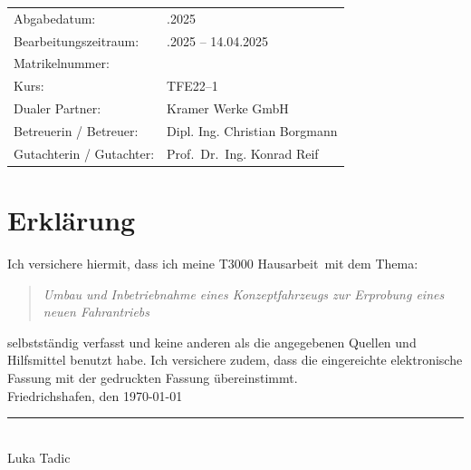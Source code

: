 \documentclass[a4paper, 12pt]{article} %
\newcommand{\titel}{Umbau und Inbetriebnahme eines Konzeptfahrzeugs zur Erprobung eines neuen Fahrantriebs}
\newcommand{\arbeit}{T3000 Hausarbeit}
\newcommand{\autor}{Luka Tadic}
\newcommand{\abgabe}{14.04.2025}
\newcommand{\bearbeitungszeitraum}{19.01.2025 – 14.04.2025}
\newcommand{\matrikelnr}{5726700}
\newcommand{\kurs}{TFE22–1} %
\newcommand{\firma}{Kramer Werke GmbH}
\newcommand{\betreuerfirma}{Dipl. Ing. Christian Borgmann}
\newcommand{\gutachterdhbw}{Prof.\ Dr.\ Ing. Konrad Reif}
\begin{document}
\begin{titlepage}
\begin{center}
\end{center}

\begin{center}
{\fontsize{12pt}{14pt}\selectfont
\begin{tabular}{ll}
Abgabedatum:                    & \quad \abgabe\\  
Bearbeitungszeitraum:           & \quad \bearbeitungszeitraum\\  
Matrikelnummer:                 & \quad \matrikelnr\\ 
Kurs:                           & \quad \kurs\\ 
Dualer Partner:                 & \quad \firma\\ %
Betreuerin / Betreuer:          & \quad \betreuerfirma\\  
Gutachterin / Gutachter:        & \quad \gutachterdhbw\\ [2ex]
\end{tabular}
}
\end{center}

\end{titlepage}

\clearpage

\pagestyle{scrheadings}  %
\hypersetup{pageanchor=true}



\section*{Erklärung}

Ich versichere hiermit, dass ich meine \arbeit\ mit dem Thema:

\begin{quote}
    \textit{\titel}
\end{quote}

selbstständig verfasst und keine anderen als die angegebenen Quellen und Hilfsmittel benutzt habe.  
Ich versichere zudem, dass die eingereichte elektronische Fassung mit der gedruckten Fassung übereinstimmt.\\[6ex]

Friedrichshafen, den \today \\[1ex]
\rule[-0.2cm]{5cm}{0.5pt} \\  
\autor\\[10ex]
\end{document}
